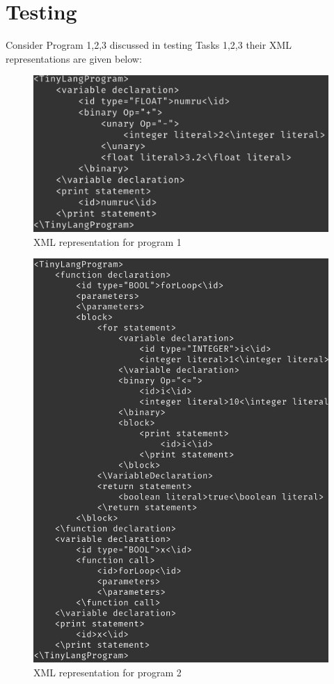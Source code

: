\section{Testing}
Consider Program 1,2,3 discussed in testing Tasks 1,2,3 their XML representations are given below:
\begin{figure}[H]
	\centering
	\includegraphics[scale=0.5]{Task345/images/xmlOutput1.png}
	\caption{XML representation for program 1}
	\label{fig:xml tree 1}
\end{figure}
\begin{figure}[H]
	\centering
	\includegraphics[scale=0.5]{Task345/images/xmlOutput2.png}
	\caption{XML representation for program 2}
	\label{fig:xml tree 2}
\end{figure}
